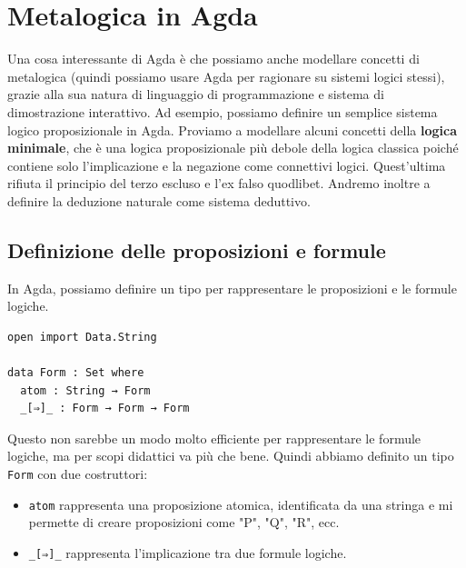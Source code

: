 \documentclass[a4paper]{article}
\theoremstyle{definition}
\theoremstyle{remark}
\begin{document}
\pagebreak

\section{Metalogica in Agda}

Una cosa interessante di Agda è che possiamo anche modellare concetti di metalogica (quindi
possiamo usare Agda per ragionare su sistemi logici stessi), grazie alla sua natura di linguaggio di programmazione e sistema di dimostrazione interattivo.
Ad esempio, possiamo definire un semplice sistema logico proposizionale in Agda.
Proviamo a modellare alcuni concetti della \textbf{logica minimale}, 
che è una logica proposizionale più debole della logica classica poiché
contiene solo l'implicazione e la negazione come connettivi logici.
Quest'ultima rifiuta il principio del terzo escluso e l'ex falso quodlibet.
Andremo inoltre a definire la deduzione naturale come sistema deduttivo.

\subsection{Definizione delle proposizioni e formule}

In Agda, possiamo definire un tipo per rappresentare le proposizioni e le formule logiche.
\begin{verbatim}
open import Data.String

data Form : Set where
  atom : String → Form
  _[⇒]_ : Form → Form → Form
\end{verbatim}
Questo non sarebbe un modo molto efficiente per rappresentare le formule logiche,
ma per scopi didattici va più che bene.
Quindi abbiamo definito un tipo \texttt{Form} con due costruttori:
\begin{itemize}
  \item \texttt{atom} rappresenta una proposizione atomica, identificata da una stringa e mi permette di creare proposizioni come "P", "Q", "R", ecc.
  \item \texttt{\_[⇒]\_} rappresenta l'implicazione tra due formule logiche.
\end{itemize}
\end{document}
